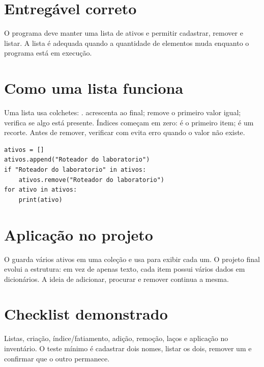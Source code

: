 \documentclass[11pt,a4paper]{article}
\begin{document}
\section*{Entregável correto}
O programa deve manter uma lista de ativos e permitir cadastrar, remover e listar. A lista é adequada quando a quantidade de elementos muda enquanto o programa está em execução.
\section*{Como uma lista funciona}
Uma lista usa colchetes: .  acrescenta ao final;  remove o primeiro valor igual;  verifica se algo está presente. Índices começam em zero:  é o primeiro item;  é um recorte. Antes de remover, verificar com  evita erro quando o valor não existe.
\begin{lstlisting}
ativos = []
ativos.append("Roteador do laboratorio")
if "Roteador do laboratorio" in ativos:
    ativos.remove("Roteador do laboratorio")
for ativo in ativos:
    print(ativo)
\end{lstlisting}
\section*{Aplicação no projeto}
O  guarda vários ativos em uma coleção e usa  para exibir cada um. O projeto final evolui a estrutura: em vez de apenas texto, cada item possui vários dados em dicionários. A ideia de adicionar, procurar e remover continua a mesma.
\section*{Checklist demonstrado}
Listas, criação, índice/fatiamento, adição, remoção, laços e aplicação no inventário. O teste mínimo é cadastrar dois nomes, listar os dois, remover um e confirmar que o outro permanece.
\end{document}
